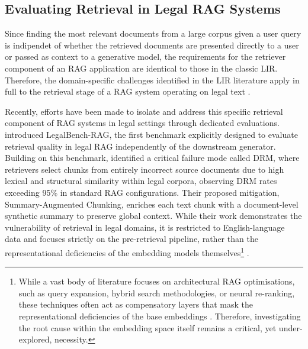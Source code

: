 \subsection{Evaluating Retrieval in Legal \ac{RAG} Systems}

Since finding the most relevant documents from a large corpus given a user query is indipendet of whether the retrieved documents are presented directly to a user or passed as context to a generative model, the requirements for the retriever component of an \ac{RAG} application are identical to those in the classic \ac{LIR}. Therefore, the domain-specific challenges identified in the \ac{LIR} literature apply in full to the retrieval stage of a \ac{RAG} system operating on legal text \cite{van_opijnen_concept_2017}\citep[p. 24]{landthaler_improving_2019}.

Recently, efforts have been made to isolate and address this specific retrieval component of \ac{RAG} systems in legal settings through dedicated evaluations. \citet{pipitone2024legalbench} introduced LegalBench-\ac{RAG}, the first benchmark explicitly designed to evaluate retrieval quality in legal \ac{RAG} independently of the downstream generator. Building on this benchmark, \citet{reuter_towards_2025} identified a critical failure mode called \ac{DRM}, where retrievers select chunks from entirely incorrect source documents due to high lexical and structural similarity within legal corpora, observing \ac{DRM} rates exceeding 95\% in standard \ac{RAG} configurations. Their proposed mitigation, Summary-Augmented Chunking, enriches each text chunk with a document-level synthetic summary to preserve global context. While their work demonstrates the vulnerability of retrieval in legal domains, it is restricted to English-language data and focuses strictly on the pre-retrieval pipeline, rather than the representational deficiencies of the embedding models themselves\footnote{While a vast body of literature focuses on architectural \ac{RAG} optimisations, such as query expansion, hybrid search methodologies, or neural re-ranking, these techniques often act as compensatory layers that mask the representational deficiencies of the base embeddings \cite{gao_2024_rag}. Therefore, investigating the root cause within the embedding space itself remains a critical, yet under-explored, necessity.} \cite{reuter_towards_2025}. 

